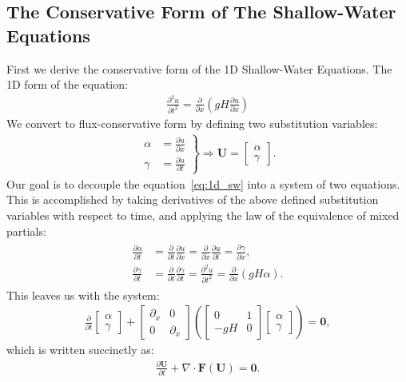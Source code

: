 \documentclass[../main.tex]{subfiles}
\begin{document}
\subsection{The Conservative Form of The Shallow-Water Equations}
First we derive the conservative form of the 1D Shallow-Water Equations. The 1D form of the equation:
\begin{gather}\label{eq:1d_sw}
	\frac{\partial^2 u}{\partial t^2} = \frac{\partial }{\partial x}\left( gH\frac{\partial u}{\partial x}\right)
\end{gather}
We convert to flux-conservative form by defining two substitution variables:
\begin{gather*}
	\left.
	\begin{aligned}
		\alpha &= \frac{\partial u}{\partial x}\\
		\gamma &= \frac{\partial u}{\partial t}
	\end{aligned}
	\right\}
	\Rightarrow
	\mathbf{U} = \begin{bmatrix}\alpha \\ \gamma \end{bmatrix}.
\end{gather*}
Our goal is to decouple the equation~\ref{eq:1d_sw} into a system of two equations. This is accomplished by taking derivatives of the above defined substitution variables with respect to time, and applying the law of the equivalence of mixed partials:
\begin{gather*}
	\begin{aligned}
		\frac{\partial \alpha}{\partial t} &= \frac{\partial}{\partial t}\frac{\partial u}{\partial x} = \frac{\partial}{\partial x}\frac{\partial u}{\partial t}=\frac{\partial \gamma}{\partial x},\\
		\frac{\partial \gamma}{\partial t} &=\frac{\partial}{\partial t}\frac{\partial \gamma}{\partial t}=\frac{\partial^2 u}{\partial t^2}=\frac{\partial }{\partial x}\left( gH\alpha\right).
	\end{aligned}
\end{gather*}
This leaves us with the system:
\begin{gather*}
	\frac{\partial }{\partial t}
	\begin{bmatrix}
		\alpha \\ \gamma
	\end{bmatrix}
	+
	\begin{bmatrix}
		\partial_x & 0\\
		0 & \partial_x 
	\end{bmatrix}
	\left(
	\begin{bmatrix}
		0 & 1\\
		-gH & 0
	\end{bmatrix}
	\begin{bmatrix}
		\alpha \\
		\gamma
	\end{bmatrix}
	\right)
	=
	\mathbf{0},
\end{gather*}
which is written succinctly as:
\begin{gather*}
	\frac{\partial \mathbf{U}}{\partial t} + \nabla\cdot\mathbf{F}(\mathbf{U}) = \mathbf{0}.
\end{gather*}
\end{document}
